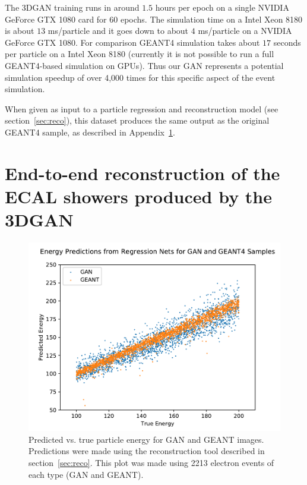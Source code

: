 The 3DGAN training runs in around $1.5$ hours per epoch on a single NVIDIA GeForce GTX 1080 card for $60$ epochs. The simulation  time  on a Intel  Xeon 8180  is about $13$ ms/particle  and it goes down to about $4$ ms/particle on a NVIDIA  GeForce  GTX  1080. For  comparison  GEANT4  simulation takes  about $17$ seconds  per  particle on  a  Intel  Xeon  8180 (currently  it  is  not  possible  to  run a full  GEANT4-based  simulation  on  GPUs). Thus our GAN represents a potential simulation speedup of over 4,000 times for this specific aspect of the event simulation.

When given as input to a particle regression and reconstruction model (see section~\ref{sec:reco}), this dataset produces the same output as the original GEANT4 sample, as described in Appendix~\ref{appendix:RECO_on_GAN}.

\section{End-to-end reconstruction of the ECAL showers produced by the 3DGAN}
\label{appendix:RECO_on_GAN}

\begin{figure}
    \centering
    \includegraphics[scale=0.4, trim={0.5cm 0.1cm 0 1.1cm}, clip]{Images/Calo/GAN_GEANT_energy_regression_comparison.pdf}
    \caption{Predicted vs. true particle energy for GAN and GEANT
      images. Predictions were made using the reconstruction tool described in section~\ref{sec:reco}. This plot was made using 2213 electron events of each type (GAN and GEANT).\label{fig:GAN_regression}}
\end{figure}

